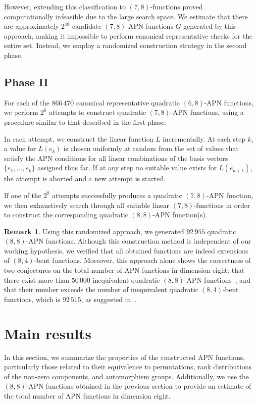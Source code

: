 \documentclass{amsart}[11pt]
\theoremstyle{plain}
\theoremstyle{definition}
\newtheorem{remark}[theorem]{Remark}
\numberwithin{theorem}{section}
\numberwithin{equation}{section}
\numberwithin{table}{section}
\numberwithin{figure}{section}
\numberwithin{algorithm}{section}
\begin{document}
However, extending this classification to $(7,8)$-functions proved computationally infeasible due to the large search space.
We estimate that there are approximately $2^{48}$ candidate $(7,8)$-APN functions $G$ generated by this approach, making it impossible to perform canonical representative checks for the entire set.
Instead, we employ a randomized construction strategy in the second phase.

\subsection*{Phase II} For each of the $866\,470$ canonical representative quadratic $(6,8)$-APN functions, we perform $2^8$ attempts to construct quadratic $(7,8)$-APN functions, using a procedure similar to that described in the first phase.

In each attempt, we construct the linear function $L$ incrementally.
At each step $k$, a value for $L(e_k)$ is chosen uniformly at random from the set of values that satisfy the APN conditions for all linear combinations of the basis vectors $\{e_1, \dots, e_k\}$ assigned thus far.
If at any step no suitable value exists for $L(e_{k+1})$, the attempt is aborted and a new attempt is started.

If one of the $2^8$ attempts successfully produces a quadratic $(7,8)$-APN function, we then exhaustively search through all suitable linear $(7,8)$-functions in order to construct the corresponding quadratic $(8,8)$-APN function(s).

\begin{remark}
    Using this randomized approach, we generated $92\,955$ quadratic $(8,8)$-APN functions.
    Although this construction method is independent of our working hypothesis, we verified that all obtained functions are indeed extensions of $(8,4)$-bent functions.
    Moreover, this approach alone shows the correctness of two conjectures on the total number of APN functions in dimension eight: that there exist more than $50\,000$ inequivalent quadratic $(8,8)$-APN functions~\cite{YuPerrin2024}, and that their number exceeds the number of inequivalent quadratic $(8,4)$-bent functions, which is $92\,515$, as suggested in~\cite{PolujanPott2022BFA}.
\end{remark}    

\section{Main results}\label{sec:results}
In this section, we summarize the properties of the constructed APN functions, particularly those related to their equivalence to permutations, rank distributions of the non-zero components, and automorphism groups. Additionally, we use the $(8,8)$-APN functions obtained in the previous section to provide an estimate of the total number of APN functions in dimension eight.
\end{document}
